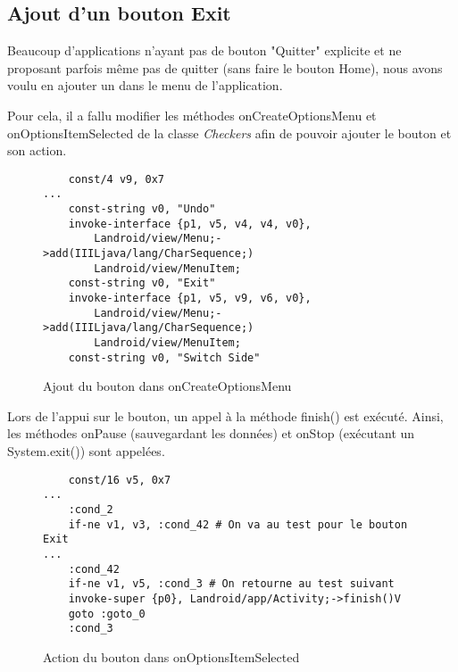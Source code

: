 
\subsection{Ajout d'un bouton Exit}

Beaucoup d'applications n'ayant pas de bouton "Quitter" explicite et ne proposant parfois même pas de quitter (sans faire le bouton Home),
nous avons voulu en ajouter un dans le menu de l'application.

Pour cela, il a fallu modifier les méthodes onCreateOptionsMenu et onOptionsItemSelected de la classe \textit{Checkers}
afin de pouvoir ajouter le bouton et son action.

\begin{figure}[!h]
\begin{verbatim}
    const/4 v9, 0x7
...
    const-string v0, "Undo"
    invoke-interface {p1, v5, v4, v4, v0},
        Landroid/view/Menu;->add(IIILjava/lang/CharSequence;)
        Landroid/view/MenuItem;
    const-string v0, "Exit"
    invoke-interface {p1, v5, v9, v6, v0},
        Landroid/view/Menu;->add(IIILjava/lang/CharSequence;)
        Landroid/view/MenuItem;
    const-string v0, "Switch Side"
\end{verbatim}
    \caption{Ajout du bouton dans onCreateOptionsMenu}
\end{figure}

Lors de l'appui sur le bouton, un appel à la méthode finish() est exécuté.
Ainsi, les méthodes onPause (sauvegardant les données) et onStop (exécutant un System.exit()) sont appelées.

\begin{figure}[!h]
\begin{verbatim}
    const/16 v5, 0x7
...
    :cond_2
    if-ne v1, v3, :cond_42 # On va au test pour le bouton Exit
...
    :cond_42
    if-ne v1, v5, :cond_3 # On retourne au test suivant
    invoke-super {p0}, Landroid/app/Activity;->finish()V
    goto :goto_0
    :cond_3
\end{verbatim}
    \caption{Action du bouton dans onOptionsItemSelected}
\end{figure}

